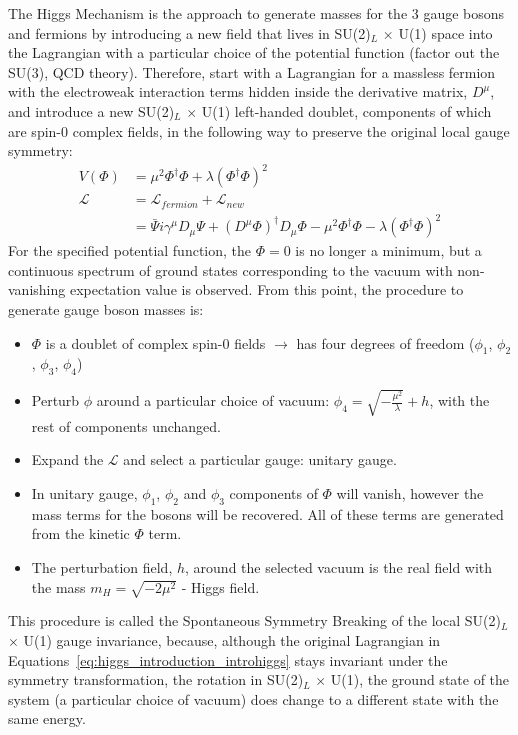 The Higgs Mechanism is the approach to generate masses for the 3 gauge bosons and fermions by introducing a new field that lives in SU(2)$_L$ $\times$ U(1) space into the Lagrangian with a particular choice of the potential function (factor out the SU(3), QCD theory). Therefore, start with a Lagrangian for a massless fermion with the electroweak interaction terms hidden inside the derivative matrix, $D^{\mu}$, and introduce a new SU(2)$_L$ $\times$ U(1) left-handed doublet, components of which are spin-0 complex fields, in the following way to preserve the original local gauge symmetry:
\begin{subequations}\label{eq:higgs_introduction_introhiggs}
\begin{align}
    V(\Phi)& = \mu^2\Phi^{\dagger}\Phi + \lambda(\Phi^{\dagger}\Phi)^2\\
    \mathcal{L}& = \mathcal{L}_{fermion} + \mathcal{L}_{new}\\
    & = \bar{\Psi}i\gamma^{\mu}D_{\mu}\Psi + (D^{\mu}\Phi)^{\dagger}D_{\mu}\Phi - \mu^2\Phi^{\dagger}\Phi - \lambda(\Phi^{\dagger}\Phi)^2
\end{align}
\end{subequations}
For the specified potential function, the $\Phi = 0$ is no longer a minimum, but a continuous spectrum of ground states corresponding to the vacuum with non-vanishing expectation value is observed. From this point, the procedure to generate gauge boson masses is:
\begin{itemize}
    \item $\Phi$ is a doublet of complex spin-0 fields $\rightarrow$ has four degrees of freedom ($\phi_1$, $\phi_2$, $\phi_3$, $\phi_4$)
    \item Perturb $\phi$ around a particular choice of vacuum: $\phi_4 = \sqrt{-\frac{\mu^2}{\lambda}} + h$, with the rest of components unchanged.
    \item Expand the $\mathcal{L}$ and select a particular gauge: unitary gauge.
    \item In unitary gauge, $\phi_1$, $\phi_2$ and $\phi_3$ components of $\Phi$ will vanish, however the mass terms for the bosons will be recovered. All of these terms are generated from the kinetic $\Phi$ term.
    \item The perturbation field, $h$, around the selected vacuum is the real field with the mass $m_H = \sqrt{-2\mu^2}$ - Higgs field.
\end{itemize}
This procedure is called the Spontaneous Symmetry Breaking of the local SU(2)$_L$ $\times$ U(1) gauge invariance, because, although the original Lagrangian in Equations~\ref{eq:higgs_introduction_introhiggs} stays invariant under the symmetry transformation, the rotation in SU(2)$_L$ $\times$ U(1), the ground state of the system (a particular choice of vacuum) does change to a different state with the same energy.

